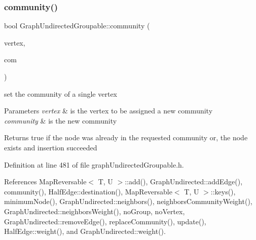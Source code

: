 \subsubsection{\texorpdfstring{community()}{community()}\hspace{0.1cm}{\footnotesize\ttfamily [2/2]}}
{\footnotesize\ttfamily bool Graph\+Undirected\+Groupable\+::community (\begin{DoxyParamCaption}\item[{const \hyperlink{edge_8h_a5fbd20c46956d479cb10afc9855223f6}{type\+Vertex} \&}]{vertex,  }\item[{const \hyperlink{graphUndirectedGroupable_8h_a914da95c9ea7f14f4b7f875c36818556}{type\+Community} \&}]{com }\end{DoxyParamCaption})\hspace{0.3cm}{\ttfamily [inline]}}

set the community of a single vertex 
\begin{DoxyParams}{Parameters}
{\em vertex} & is the vertex to be assigned a new community \\
\hline
{\em community} & is the new community \\
\hline
\end{DoxyParams}
\begin{DoxyReturn}{Returns}
true if the node was already in the requested community or, the node exists and insertion succeeded 
\end{DoxyReturn}


Definition at line 481 of file graph\+Undirected\+Groupable.\+h.



References Map\+Reversable$<$ T, U $>$\+::add(), Graph\+Undirected\+::add\+Edge(), community(), Half\+Edge\+::destination(), Map\+Reversable$<$ T, U $>$\+::keys(), minimum\+Node(), Graph\+Undirected\+::neighbors(), neighbors\+Community\+Weight(), Graph\+Undirected\+::neighbors\+Weight(), no\+Group, no\+Vertex, Graph\+Undirected\+::remove\+Edge(), replace\+Community(), update(), Half\+Edge\+::weight(), and Graph\+Undirected\+::weight().

